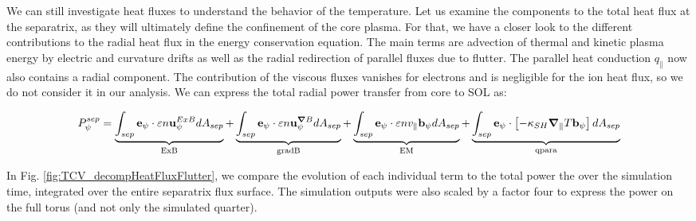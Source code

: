 We can still investigate heat fluxes to understand the behavior of the temperature. Let us examine the components to the total heat flux at the separatrix, as they will ultimately define the confinement of the core plasma. For that, we have a closer look to the different contributions to the radial heat flux in the energy conservation equation. The main terms are advection of thermal and kinetic plasma energy by electric and curvature drifts as well as the radial redirection of parallel fluxes due to flutter. The parallel heat conduction $q_\parallel$ now also contains a radial component. The contribution of the viscous fluxes vanishes for electrons and is negligible for the ion heat flux, so we do not consider it in our analysis. We can express the total radial power transfer from core to SOL as: 

\begin{equation}
	P_\psi^{sep} = \underbrace{\int_{sep} \mathbf{e}_\psi \cdot \varepsilon n \mathbf{u}^{ExB}_\psi dA_{sep}}_{\text{ExB}} + \underbrace{\int_{sep} \mathbf{e}_\psi \cdot \varepsilon n \mathbf{u}^{\grad B}_\psi dA_{sep}}_{\text{gradB}} + \underbrace{\int_{sep} \mathbf{e}_\psi \cdot \varepsilon n v_\parallel \mathbf{b}_\psi dA_{sep}}_{\text{EM}} + \underbrace{\int_{sep} \mathbf{e}_\psi\cdot\left[-\kappa_{SH} \grad_\parallel T\mathbf{b}_\psi\right] dA_{sep}}_{\text{qpara}}
\end{equation}

In Fig. \ref{fig:TCV_decompHeatFluxFlutter}, we compare the evolution of each individual term to the total power the over the simulation time, integrated over the entire separatrix flux surface. The simulation outputs were also scaled by a factor four to express the power on the full torus (and not only the simulated quarter).


